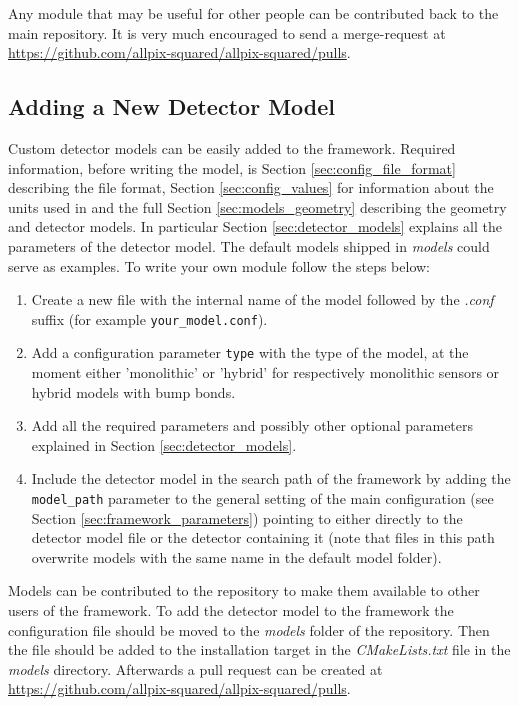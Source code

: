 Any module that may be useful for other people can be contributed back to the main repository. It is very much encouraged to send a merge-request at \url{https://github.com/allpix-squared/allpix-squared/pulls}.

\subsection{Adding a New Detector Model}
\label{sec:adding_detector_model}
Custom detector models can be easily added to the framework. Required information, before writing the model, is Section \ref{sec:config_file_format} describing the file format, Section \ref{sec:config_values} for information about the units used in \apsq and the full Section \ref{sec:models_geometry} describing the geometry and detector models. In particular Section \ref{sec:detector_models} explains all the parameters of the detector model. The default models shipped in \textit{models} could serve as examples. To write your own module follow the steps below:
\begin{enumerate}
\item Create a new file with the internal name of the model followed by the \textit{.conf} suffix (for example \texttt{your\_model.conf}).
\item Add a configuration parameter \texttt{type} with the type of the model, at the moment either 'monolithic' or 'hybrid' for respectively monolithic sensors or hybrid models with bump bonds.
\item Add all the required parameters and possibly other optional parameters explained in Section \ref{sec:detector_models}.
\item Include the detector model in the search path of the framework by adding the \texttt{model\_path} parameter to the general setting of the main configuration (see Section \ref{sec:framework_parameters}) pointing to either directly to the detector model file or the detector containing it (note that files in this path overwrite models with the same name in the default model folder).
\end{enumerate}

Models can be contributed to the repository to make them available to other users of the framework. To add the detector model to the framework the configuration file should be moved to the \textit{models} folder of the repository. Then the file should be added to the installation target in the \textit{CMakeLists.txt} file in the \textit{models} directory. Afterwards a pull request can be created at \url{https://github.com/allpix-squared/allpix-squared/pulls}.

